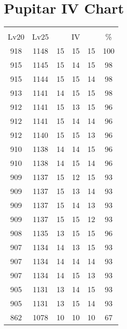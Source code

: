 \documentclass{article}%
\begin{document}
%
\normalsize%
\section{Pupitar IV Chart}%
\label{sec:Pupitar IV Chart}%
\renewcommand{\arraystretch}{1.5}%
\begin{tabular}{|c|c|c|c|c|c|}%
\hline%
\multicolumn{6}{|c|}{\textcolor{white}{ 
\linebreak{Pupitar}
}%
\cellcolor{black}}\\%
\multicolumn{1}{|c}{Lv20}&\multicolumn{1}{c|}{Lv25}&\multicolumn{3}{c|}{IV}&\multicolumn{1}{|c|}{\%}\\%
\hline%
\rowcolor{color100}%
918&1148&15&15&15&100\\%
\hline%
\rowcolor{color98}%
915&1145&15&14&15&98\\%
\hline%
\rowcolor{color98}%
915&1144&15&15&14&98\\%
\hline%
\rowcolor{color98}%
913&1141&14&15&15&98\\%
\hline%
\rowcolor{color96}%
912&1141&15&13&15&96\\%
\hline%
\rowcolor{color96}%
912&1141&15&14&14&96\\%
\hline%
\rowcolor{color96}%
912&1140&15&15&13&96\\%
\hline%
\rowcolor{color96}%
910&1138&14&14&15&96\\%
\hline%
\rowcolor{color96}%
910&1138&14&15&14&96\\%
\hline%
\rowcolor{color93}%
909&1137&15&12&15&93\\%
\hline%
\rowcolor{color93}%
909&1137&15&13&14&93\\%
\hline%
\rowcolor{color93}%
909&1137&15&14&13&93\\%
\hline%
\rowcolor{color93}%
909&1137&15&15&12&93\\%
\hline%
\rowcolor{color96}%
908&1135&13&15&15&96\\%
\hline%
\rowcolor{color93}%
907&1134&14&13&15&93\\%
\hline%
\rowcolor{color93}%
907&1134&14&14&14&93\\%
\hline%
\rowcolor{color93}%
907&1134&14&15&13&93\\%
\hline%
\rowcolor{color93}%
905&1131&13&14&15&93\\%
\hline%
\rowcolor{color93}%
905&1131&13&15&14&93\\%
\hline%
\rowcolor{color91}%
862&1078&10&10&10&67\\%
\end{tabular}

%
\end{document}
